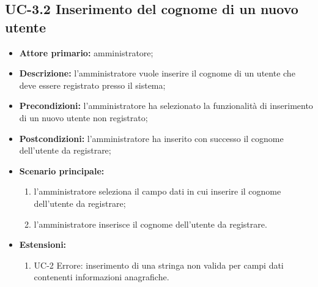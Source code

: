 \subsection{UC-3.2 Inserimento del cognome di un nuovo utente}
\begin{itemize}
	\item \textbf{Attore primario:} amministratore;

	\item \textbf{Descrizione:} l'amministratore vuole inserire il cognome di un utente che deve essere registrato presso il sistema;

	\item \textbf{Precondizioni:} l'amministratore ha selezionato la funzionalità di inserimento di un nuovo utente non registrato;

	\item \textbf{Postcondizioni:} l'amministratore ha inserito con successo il cognome dell'utente da registrare;

	\item \textbf{Scenario principale:}
	      \begin{enumerate}
		      \item l'amministratore seleziona il campo dati in cui inserire il cognome dell'utente da registrare;
		      \item l'amministratore inserisce il cognome dell'utente da registrare.
	      \end{enumerate}
	\item \textbf{Estensioni:}
	      \begin{enumerate}
		      \item UC-2 Errore: inserimento di una stringa non valida per campi dati contenenti informazioni anagrafiche.
	      \end{enumerate}
\end{itemize}

